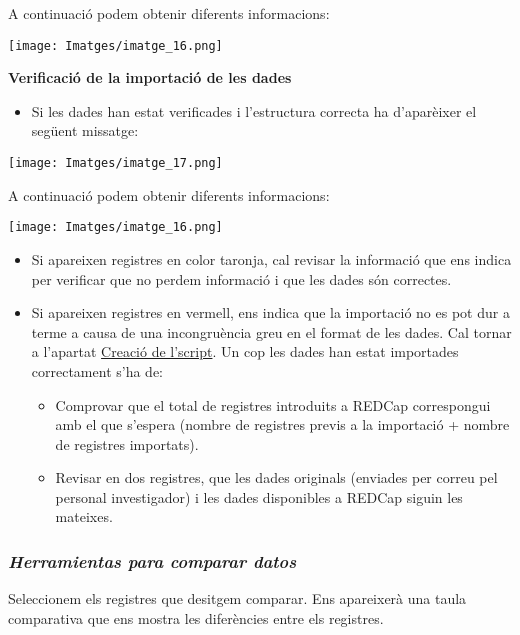 \documentclass[
]{article}
\providecommand{\tightlist}{%
  \setlength{\itemsep}{0pt}\setlength{\parskip}{0pt}}
\begin{document}
A continuació podem obtenir diferents informacions:

\texttt{[image: Imatges/imatge\_16.png]}

\textbf{Verificació de la importació de les dades}

\begin{itemize}
\tightlist
\item
  Si les dades han estat verificades i l'estructura correcta ha d'aparèixer el següent missatge:
\end{itemize}

\texttt{[image: Imatges/imatge\_17.png]}

A continuació podem obtenir diferents informacions:

\texttt{[image: Imatges/imatge\_16.png]}

\begin{itemize}
\tightlist
\item
  Si apareixen registres en color taronja, cal revisar la informació que ens indica per verificar que no perdem informació i que les dades són correctes.
\item
  Si apareixen registres en vermell, ens indica que la importació no es pot dur a terme a causa de una incongruència greu en el format de les dades. Cal tornar a l'apartat \protect\hyperlink{en11}{Creació de l'script}.
  Un cop les dades han estat importades correctament s'ha de:

  \begin{itemize}
  \tightlist
  \item
    Comprovar que el total de registres introduits a REDCap correspongui amb el que s'espera (nombre de registres previs a la importació + nombre de registres importats).
  \item
    Revisar en dos registres, que les dades originals (enviades per correu pel personal investigador) i les dades disponibles a REDCap siguin les mateixes.
  \end{itemize}
\end{itemize}

\hypertarget{herramientas-para-comparar-datos}{%
\subsubsection{\texorpdfstring{\textbf{\emph{Herramientas para comparar datos}}}{Herramientas para comparar datos}}\label{herramientas-para-comparar-datos}}

Seleccionem els registres que desitgem comparar. Ens apareixerà una taula comparativa que ens mostra les diferències entre els registres.
\end{document}
